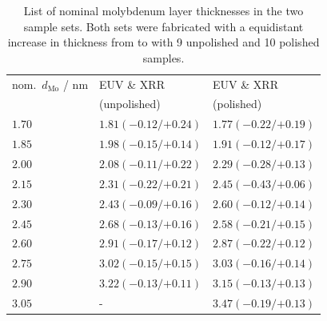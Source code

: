 \begin{table}[htbp]
\centering
\caption[List of nominal molybdenum layer thicknesses in the two Mo/Si/C sample sets.]{List of nominal molybdenum layer thicknesses in the two sample sets. Both sets were fabricated with a equidistant increase in thickness from  to  with 9 unpolished and 10 polished samples.}
\label{ch_spec:tbl_mo_si_thickness_mcmc_result}
\begin{tabular}{@{}lll@{}}
\toprule
nom.~$d_\text{Mo}$ / nm & EUV \& XRR &EUV \& XRR\\ 
&(unpolished) & (polished) \\
\midrule
$1.70$ &$1.81({-0.12}/{+0.24})$  &$1.77({-0.22}/{+0.19})$ \\
$1.85$ &$1.98({-0.15}/{+0.14})$  &$1.91({-0.12}/{+0.17})$ \\
$2.00$ &$2.08({-0.11}/{+0.22})$  &$2.29({-0.28}/{+0.13})$ \\
$2.15$ &$2.31({-0.22}/{+0.21})$  &$2.45({-0.43}/{+0.06})$ \\
$2.30$ &$2.43({-0.09}/{+0.16})$   &$2.60({-0.12}/{+0.14})$ \\
$2.45$ &$2.68({-0.13}/{+0.16})$  &$2.58({-0.21}/{+0.15})$ \\
$2.60$ &$2.91({-0.17}/{+0.12})$ &$2.87({-0.22}/{+0.12})$ \\
$2.75$ &$3.02({-0.15}/{+0.15})$  &$3.03({-0.16}/{+0.14})$ \\
$2.90$ &$3.22({-0.13}/{+0.11})$ &$3.15({-0.13}/{+0.13})$ \\
$3.05$ &-  & $3.47({-0.19}/{+0.13})$ \\
 \bottomrule
\end{tabular}
\end{table}

